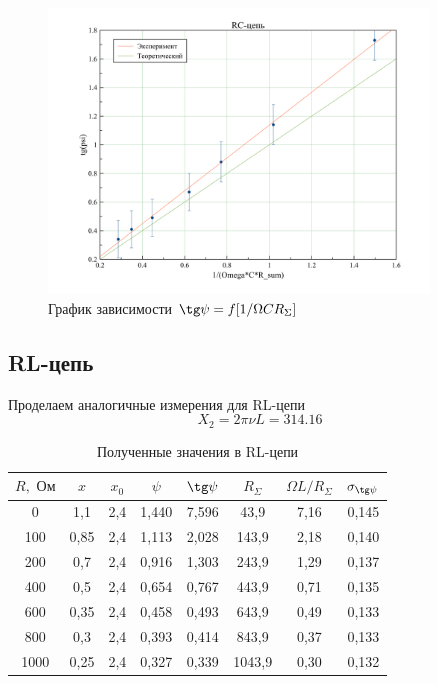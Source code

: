 \documentclass[a4paper, 12pt]{article}
\begin{document}
	\begin {figure}[H]
		\begin{center}
			\includegraphics[width=0.9\textwidth]{RC}
			\caption{График зависимости $\tg \psi = f[1/ \Omega C R_{\Sigma}]$}
		\end{center}
	\end {figure}

\subsection*{RL-цепь}
Проделаем аналогичные измерения для RL-цепи
$$X_2 = 2 \pi \nu L = 314.16$$

\begin{table}[H]
\centering
\begin{tabular}{|c|c|c|c|c|c|c|c|}
\hline
$R, \text{ Ом}$ & $x$ & $x_0$ & $\psi$ & $\tg \psi$ & $R_{\Sigma}$ & $\Omega L/ R_{\Sigma} $ & $\sigma_{\tg\psi}$ \\ \hline
0&	1,1&	2,4&	1,440&	7,596&	43,9& 7,16&	0,145\\ \hline
100&	0,85&	2,4&	1,113&	2,028&	143,9& 2,18&	0,140\\ \hline
200&	0,7&	2,4&	0,916&	1,303&	243,9& 1,29&	0,137\\ \hline
400&	0,5&	2,4&	0,654&	0,767&	443,9& 0,71&	0,135\\ \hline
600&	0,35&	2,4&	0,458&	0,493&	643,9& 0,49&	0,133\\ \hline
800&	0,3&	2,4&	0,393&	0,414&	843,9& 0,37&	0,133\\ \hline
1000&	0,25&	2,4&	0,327&	0,339&	1043,9& 0,30&	0,132\\ \hline
\end{tabular}
\caption{Полученные значения в RL-цепи}
\end{table}
\end{document}
